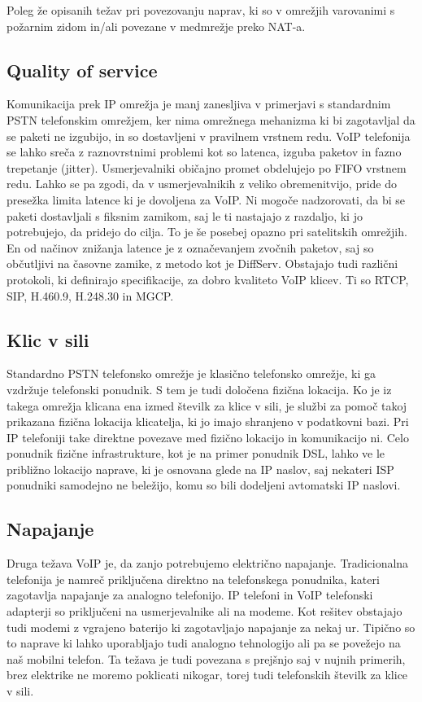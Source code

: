 \documentclass{acm_proc_article-sp}
\begin{document}
Poleg že opisanih težav pri povezovanju naprav, ki so v omrežjih varovanimi s požarnim zidom in/ali povezane v medmrežje preko NAT-a.

\subsection{Quality of service}
Komunikacija prek IP omrežja je manj zanesljiva v primerjavi s standardnim PSTN telefonskim omrežjem, ker nima omrežnega mehanizma ki bi zagotavljal da se paketi ne izgubijo, in so dostavljeni v pravilnem vrstnem redu. VoIP telefonija se lahko sreča z raznovrstnimi problemi kot so latenca, izguba paketov in fazno trepetanje (jitter).
Usmerjevalniki običajno promet obdelujejo po FIFO vrstnem redu. Lahko se pa zgodi, da v usmerjevalnikih z veliko obremenitvijo, pride do presežka limita latence ki je dovoljena za VoIP. Ni mogoče nadzorovati, da bi se paketi dostavljali s fiksnim zamikom, saj le ti nastajajo z razdaljo, ki jo potrebujejo, da pridejo do cilja. To je še posebej opazno pri satelitskih omrežjih. En od načinov znižanja latence je z označevanjem zvočnih paketov, saj so občutljivi na časovne zamike, z metodo kot je DiffServ. Obstajajo tudi različni protokoli, ki definirajo specifikacije, za dobro kvaliteto VoIP klicev. Ti so RTCP, SIP, H.460.9, H.248.30 in MGCP.

\subsection{Klic v sili}
Standardno PSTN telefonsko omrežje je klasično telefonsko omrežje, ki ga vzdržuje telefonski ponudnik. S tem je tudi določena fizična lokacija. Ko je iz takega omrežja klicana ena izmed številk za klice v sili, je službi za pomoč takoj prikazana fizična lokacija klicatelja, ki jo imajo shranjeno v podatkovni bazi. Pri IP telefoniji take direktne povezave med fizično lokacijo in komunikacijo ni. Celo ponudnik fizične infrastrukture, kot je na primer ponudnik DSL, lahko ve le približno lokacijo naprave, ki je osnovana glede na IP naslov, saj nekateri ISP ponudniki samodejno ne beležijo, komu so bili dodeljeni avtomatski IP naslovi.

\subsection{Napajanje}
Druga težava VoIP je, da zanjo potrebujemo električno napajanje. Tradicionalna telefonija je namreč priključena direktno na telefonskega ponudnika, kateri zagotavlja napajanje za analogno telefonijo. IP telefoni in VoIP telefonski adapterji so priključeni na usmerjevalnike ali na modeme. Kot rešitev obstajajo tudi modemi z vgrajeno baterijo ki zagotavljajo napajanje za nekaj ur. Tipično so to naprave ki lahko uporabljajo tudi analogno tehnologijo ali pa se povežejo na naš mobilni telefon. Ta težava je tudi povezana s prejšnjo saj v nujnih primerih, brez elektrike ne moremo poklicati nikogar, torej tudi telefonskih številk za klice v sili.
\end{document}
